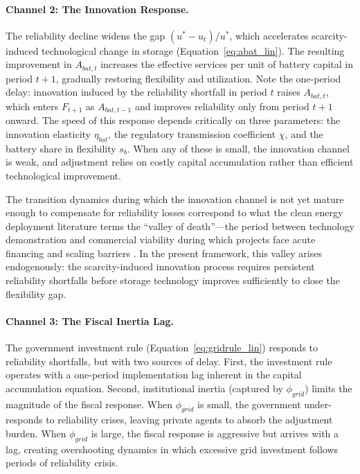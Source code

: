 \documentclass[12pt, a4paper]{article}
\begin{document}
\paragraph{Channel 2: The Innovation Response.}
The reliability decline widens the gap $(u^* - u_t)/u^*$, which accelerates scarcity-induced technological change in storage (Equation~\ref{eq:abat_lin}). The resulting improvement in $A_{bat,t}$ increases the effective services per unit of battery capital in period $t+1$, gradually restoring flexibility and utilization. Note the one-period delay: innovation induced by the reliability shortfall in period $t$ raises $A_{bat,t}$, which enters $F_{t+1}$ as $A_{bat,t-1}$ and improves reliability only from period $t+1$ onward. The speed of this response depends critically on three parameters: the innovation elasticity $\eta_{bat}$, the regulatory transmission coefficient $\chi$, and the battery share in flexibility $s_b$. When any of these is small, the innovation channel is weak, and adjustment relies on costly capital accumulation rather than efficient technological improvement.

The transition dynamics during which the innovation channel is not yet mature enough to compensate for reliability losses correspond to what the clean energy deployment literature terms the ``valley of death''---the period between technology demonstration and commercial viability during which projects face acute financing and scaling barriers \citep{nemet2018}. In the present framework, this valley arises endogenously: the scarcity-induced innovation process requires persistent reliability shortfalls before storage technology improves sufficiently to close the flexibility gap.

\paragraph{Channel 3: The Fiscal Inertia Lag.}
The government investment rule (Equation~\ref{eq:gridrule_lin}) responds to reliability shortfalls, but with two sources of delay. First, the investment rule operates with a one-period implementation lag inherent in the capital accumulation equation. Second, institutional inertia (captured by $\phi_{grid}$) limits the magnitude of the fiscal response. When $\phi_{grid}$ is small, the government under-responds to reliability crises, leaving private agents to absorb the adjustment burden. When $\phi_{grid}$ is large, the fiscal response is aggressive but arrives with a lag, creating overshooting dynamics in which excessive grid investment follows periods of reliability crisis.
\end{document}

